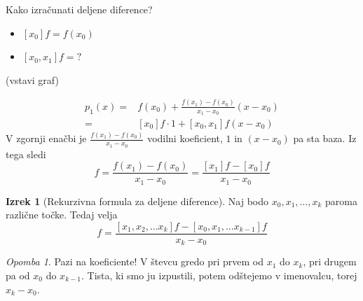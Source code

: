 \documentclass[a4paper,12pt]{article}
\theoremstyle{definition}
\newtheorem{theorem}[counter]{Izrek}
\theoremstyle{remark}
\newtheorem*{rem}{Opomba}
\begin{document}
Kako izračunati deljene diference?

\begin{itemize}
    \item $[x_0] f = f(x_0)$
    \item $[x_0, x_1] f = \text{?}$
\end{itemize}

(vstavi graf)

\begin{align*}
    p_1 (x) =& f(x_0) + \frac{f(x_1)- f(x_0)}{x_1 - x_0} (x-x_0) \\
            =& [x_0] f \cdot 1 + [x_0, x_1] f (x-x_0)
\end{align*}
V zgornji enačbi je $\frac{f(x_1)- f(x_0)}{x_1 - x_0}$ vodilni koeficient, $1$ in $(x-x_0)$ pa sta baza. Iz tega sledi
\begin{equation*}
    [x_0, x_1] f = \frac{f(x_1)- f(x_0)}{x_1 - x_0} = \frac{[x_1]f - [x_0]f}{x_1 - x_0}    
\end{equation*}



\begin{theorem}[Rekurzivna formula za deljene diference]
    Naj bodo $x_0, x_1, \dots, x_k$ paroma različne točke. Tedaj velja
    \begin{equation*}
        [x_0, x_1, \dots, x_k]f = \frac{[x_1, x_2, \dots x_k] f - [x_0, x_1, \dots x_{k-1}]f}{x_k - x_0}
    \end{equation*}
\end{theorem}

\begin{rem}
    Pazi na koeficiente! V števcu gredo pri prvem od $x_1$ do $x_k$, pri drugem pa od $x_0$ do $x_{k-1}$. Tista, ki smo ju izpustili,
    potem odštejemo v imenovalcu, torej $x_k-x_0$.
\end{rem}
\end{document}
